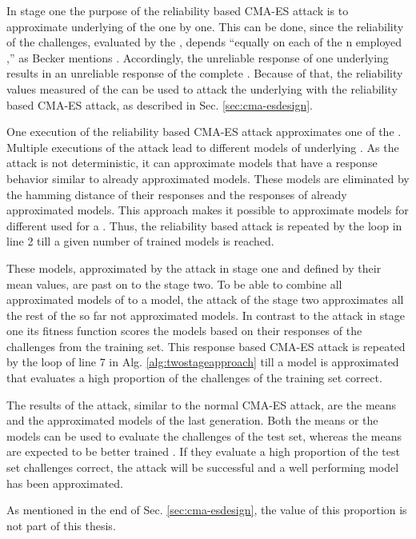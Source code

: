 In stage one the purpose of the reliability based \ac{CMA-ES} attack is to approximate underlying \apufs of the \xpuf one by one.
This can be done, since the reliability of the challenges, evaluated by the \xpuf, depends ``equally on each of the n employed \apufs,'' as Becker mentions \cite{Becker2015ThePUFs}. %
Accordingly, the unreliable response of one underlying \apuf results in an unreliable response of the complete \puf.
Because of that, the reliability values measured of the \xpuf can be used to attack the underlying \apufs with the reliability based \ac{CMA-ES} attack, as described in Sec. \ref{sec:cma-esdesign}.

One execution of the reliability based \ac{CMA-ES} attack approximates one of the \apufs.
Multiple executions of the attack lead to different models of underlying \apufs. %
As the attack is not deterministic, it can approximate models that have a response behavior similar to already approximated models.
These models are eliminated by the hamming distance of their responses and the responses of already approximated models. %
This approach makes it possible to approximate models for different \apufs used for a \xpuf.
Thus, the reliability based attack is repeated by the loop in line 2 till a given number of trained models is reached.

These models, approximated by the attack in stage one and defined by their mean values, are past on to the stage two.
To be able to combine all approximated models of \apuf to a \xpuf model, the attack of the stage two approximates all the rest of the so far not approximated models. %
In contrast to the attack in stage one its fitness function scores the models based on their responses of the challenges from the training set. %
This response based \ac{CMA-ES} attack is repeated by the loop of line 7 in Alg. \ref{alg:twostageapproach} till a model is approximated that evaluates a high proportion of the challenges of the training set correct.

The results of the attack, similar to the normal \ac{CMA-ES} attack, are the means and the approximated models of the last generation.
Both the means or the models can be used to evaluate the challenges of the test set, whereas the means are expected to be better trained \cite{Wikipedia2017CMA-ES}.
If they evaluate a high proportion of the test set challenges correct, the attack will be successful and a well performing model has been approximated. %

As mentioned in the end of Sec. \ref{sec:cma-esdesign}, the value of this proportion is not part of this thesis.

